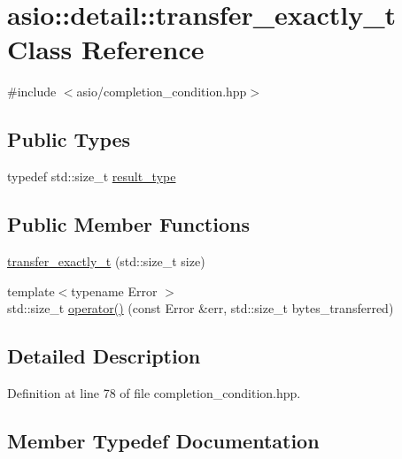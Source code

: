 \hypertarget{classasio_1_1detail_1_1transfer__exactly__t}{}\section{asio\+:\+:detail\+:\+:transfer\+\_\+exactly\+\_\+t Class Reference}
\label{classasio_1_1detail_1_1transfer__exactly__t}


{\ttfamily \#include $<$asio/completion\+\_\+condition.\+hpp$>$}

\subsection*{Public Types}
\begin{DoxyCompactItemize}
\item 
typedef std\+::size\+\_\+t \hyperlink{classasio_1_1detail_1_1transfer__exactly__t_a6d16742df4d96f69895c3a0d36df88b7}{result\+\_\+type}
\end{DoxyCompactItemize}
\subsection*{Public Member Functions}
\begin{DoxyCompactItemize}
\item 
\hyperlink{classasio_1_1detail_1_1transfer__exactly__t_a2f026854a1ee10848f0a26927ae8222b}{transfer\+\_\+exactly\+\_\+t} (std\+::size\+\_\+t size)
\item 
{\footnotesize template$<$typename Error $>$ }\\std\+::size\+\_\+t \hyperlink{classasio_1_1detail_1_1transfer__exactly__t_a699ae9d24f60c1e6e159b525e0ffc081}{operator()} (const Error \&err, std\+::size\+\_\+t bytes\+\_\+transferred)
\end{DoxyCompactItemize}


\subsection{Detailed Description}


Definition at line 78 of file completion\+\_\+condition.\+hpp.



\subsection{Member Typedef Documentation}
\hypertarget{classasio_1_1detail_1_1transfer__exactly__t_a6d16742df4d96f69895c3a0d36df88b7}{}
